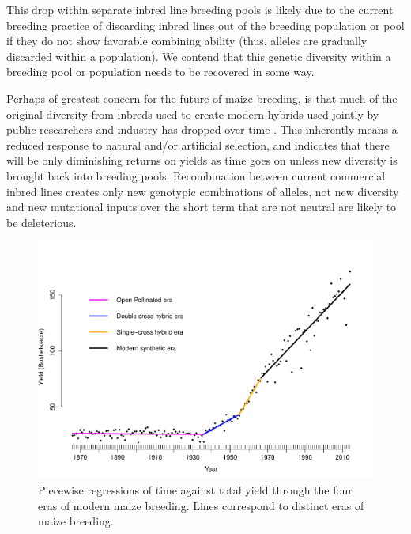 \documentclass[12pt]{article}
\begin{document}
This drop within separate inbred line breeding pools is likely due to the current breeding practice of discarding inbred lines out of the breeding population or pool if they do not show favorable combining ability (thus, alleles are gradually discarded within a population).  
We contend that this genetic diversity within a breeding pool or population needs to be recovered in some way.  
%
%

Perhaps of greatest concern for the future of maize breeding, is that much of the original diversity from inbreds used to create modern hybrids used jointly by public researchers and industry has dropped over time \citep{Gerke:2013tw}. 
This inherently means a reduced response to natural and/or artificial selection, and indicates that there will be only diminishing returns on yields as time goes on unless new diversity is brought back into breeding pools. 
Recombination between current commercial inbred lines creates only new genotypic combinations of alleles, not new diversity and new mutational inputs over the short term that are not neutral are likely to be deleterious.

\begin{figure}[ht]
\includegraphics[width=1.0\linewidth]{yield.pdf}
\caption{Piecewise regressions of time against total yield through the four eras of modern maize breeding. Lines correspond to distinct eras of maize breeding.} 
\label{fig:piecewise}
\end{figure}
\end{document}
